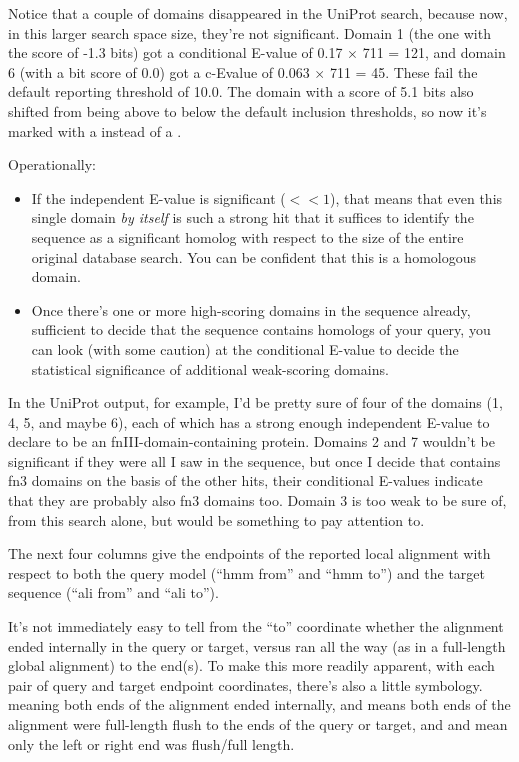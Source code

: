 Notice that a couple of domains disappeared in the UniProt search,
because now, in this larger search space size, they're not
significant. Domain 1 (the one with the score of -1.3 bits) got a
conditional E-value of 0.17 $\times$ 711 = 121, and domain 6 (with a
bit score of 0.0) got a c-Evalue of 0.063 $\times$ 711 = 45. These
fail the default reporting threshold of 10.0. The domain with a score
of 5.1 bits also shifted from being above to below the default
inclusion thresholds, so now it's marked with a  instead of a
\ccode{!}.

Operationally:

\begin{itemize}
\item If the independent E-value is significant ($<<1$), that means
that even this single domain \emph{by itself} is such a strong hit
that it suffices to identify the sequence as a significant homolog
with respect to the size of the entire original database search. You
can be confident that this is a homologous domain.

\item Once there's one or more high-scoring domains in the sequence
already, sufficient to decide that the sequence contains homologs of
your query, you can look (with some caution) at the conditional
E-value to decide the statistical significance of additional
weak-scoring domains.
\end{itemize}

In the UniProt output, for example, I'd be pretty sure of four of the
domains (1, 4, 5, and maybe 6), each of which has a strong enough
independent E-value to declare  to be an
fnIII-domain-containing protein. Domains 2 and 7 wouldn't be
significant if they were all I saw in the sequence, but once I decide
that  contains fn3 domains on the basis of the
other hits, their conditional E-values indicate that they are probably
also fn3 domains too. Domain 3 is too weak to be sure of, from this
search alone, but would be something to pay attention to.

The next four columns give the endpoints of the reported local
alignment with respect to both the query model (``hmm from'' and ``hmm
to'') and the target sequence (``ali from'' and ``ali to''). 

It's not immediately easy to tell from the ``to'' coordinate whether
the alignment ended internally in the query or target, versus ran all
the way (as in a full-length global alignment) to the end(s). To make
this more readily apparent, with each pair of query and target
endpoint coordinates, there's also a little symbology. 
meaning both ends of the alignment ended internally, and \prog{[]}
means both ends of the alignment were full-length flush to the ends of
the query or target, and \prog{[.} and \prog{.]} mean only the left or
right end was flush/full length. 

